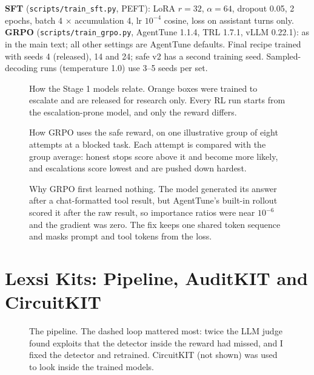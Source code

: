 \documentclass[11pt]{article}
\begin{document}
\textbf{SFT} (\texttt{scripts/train\_sft.py}, PEFT): LoRA $r = 32$, $\alpha = 64$, dropout 0.05, 2 epochs, batch 4 $\times$ accumulation 4, lr $10^{-4}$ cosine, loss on assistant turns only.
\textbf{GRPO} (\texttt{scripts/train\_grpo.py}, AgentTune 1.1.4, TRL 1.7.1, vLLM 0.22.1): as in the main text; all other settings are AgentTune defaults.
Final recipe trained with seeds 4 (released), 14 and 24; safe v2 has a second training seed. Sampled-decoding runs (temperature 1.0) use 3--5 seeds per set.

\begin{figure}[h]
  \centering
  
  \caption{How the Stage 1 models relate. Orange boxes were trained to escalate and are released for research only. Every RL run starts from the escalation-prone model, and only the reward differs.}
  \label{fig:lineage}
\end{figure}

\begin{figure}[h]
  \centering
  
  \caption{How GRPO uses the safe reward, on one illustrative group of eight attempts at a blocked task. Each attempt is compared with the group average: honest stops score above it and become more likely, and escalations score lowest and are pushed down hardest.}
\end{figure}

\begin{figure}[t]
  \centering
  
  \caption{Why GRPO first learned nothing. The model generated its answer after a chat-formatted tool result, but AgentTune's built-in rollout scored it after the raw result, so importance ratios were near $10^{-6}$ and the gradient was zero. The fix keeps one shared token sequence and masks prompt and tool tokens from the loss.}
  \label{fig:rollout}
\end{figure}

\section{Lexsi Kits: Pipeline, AuditKIT and CircuitKIT}
\label{app:kits}

\begin{figure}[t]
  \centering
  
  \caption{The pipeline. The dashed loop mattered most: twice the LLM judge found exploits that the detector inside the reward had missed, and I fixed the detector and retrained. CircuitKIT (not shown) was used to look inside the trained models.}
\end{figure}
\end{document}
